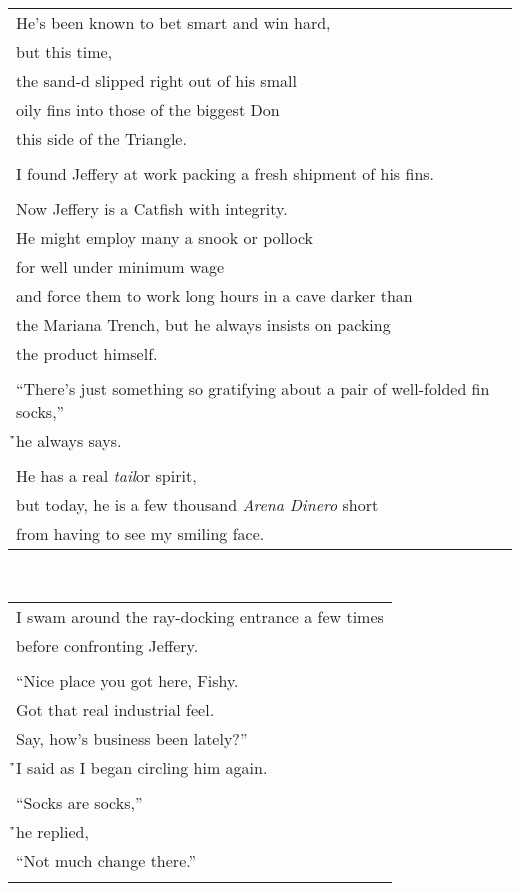 \documentclass{article}
\begin{document}
\begin{center}
\begin{tabular}{l}
He's been known to bet smart and win hard, \\
but this time, \\
the sand-d slipped right out of his small \\
oily fins into those of the biggest Don \\ %
this side of the Triangle. \\
\\
I found Jeffery at work packing a fresh shipment of his fins. \\
\\
Now Jeffery is a Catfish with integrity. \\
He might employ many a snook or pollock \\
for well under minimum wage \\
and force them to work long hours in a cave darker than \\
the Mariana Trench, but he always insists on packing \\
the product himself. \\
\\
``There's just something so gratifying about a pair of well-folded fin socks,'' \\
\h\h{}he always says. \\
\\
He has a real \textit{tail}or spirit, \\
but today, he is a few thousand \textit{Arena Dinero} short \\ %
from having to see my smiling face. \\
\end{tabular} \\
\begin{tabular}{l}
I swam around the ray-docking entrance a few times \\
before confronting Jeffery. \\
\\
``Nice place you got here, Fishy. \\
Got that real industrial feel. \\
Say, how's business been lately?'' \\
\h\h{}I said as I began circling him again. \\
\\
``Socks are socks,'' \\
\h\h{}he replied, \\
``Not much change there.'' \\
\\

\end{tabular}
\end{center}
\end{document}
